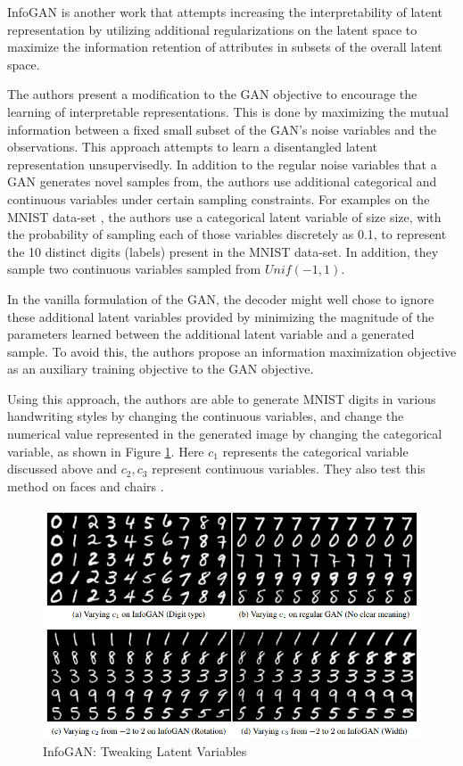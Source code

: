 InfoGAN \citep{chen2016infogan} is another work that attempts increasing the interpretability of latent representation by utilizing additional regularizations on the latent space to maximize the information retention of attributes in subsets of the overall latent space.

The authors present a modification to the GAN objective \citep{goodfellow2014generative} to encourage the learning of interpretable representations. This is done by maximizing the
mutual information between a fixed small subset of the GAN's noise variables and the observations. This approach attempts to learn a disentangled latent representation unsupervisedly. In addition to the regular noise variables that a GAN generates novel samples from, the authors use additional categorical and continuous variables under certain sampling constraints. For examples on the MNIST data-set \citep{lecun2010mnist}, the authors use a categorical latent variable of size size, with the probability of sampling each of those variables discretely as 0.1, to represent the 10 distinct digits (labels) present in the MNIST data-set. In addition, they sample two continuous variables sampled from $Unif(-1, 1)$.

In the vanilla formulation of the GAN, the decoder might well chose to ignore these additional latent variables provided by minimizing the magnitude of the parameters learned between the additional latent variable and a generated sample. To avoid this, the authors propose an information maximization objective as an auxiliary training objective to the GAN objective.

Using this approach, the authors are able to generate MNIST digits in various handwriting styles by changing the continuous variables, and change the numerical value represented in the generated image by changing the categorical variable, as shown in Figure \ref{fig:infogan-digits}. Here $c_1$ represents the categorical variable discussed above and $c_2, c_3$ represent continuous variables. They also test this method on faces \citep{liu2015deep,paysan20093d} and chairs \citep{aubry2014seeing}.

\begin{figure}[ht]
	\centering
	\includegraphics[width=\textwidth]{images/infogan-digits}
	\caption{\label{fig:infogan-digits} InfoGAN: Tweaking Latent Variables}
\end{figure}


